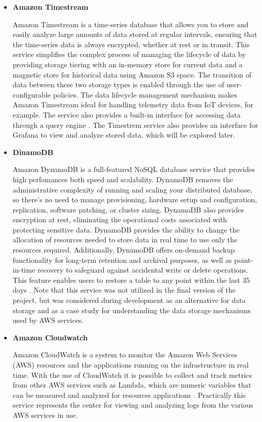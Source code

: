 \begin{itemize}
    \item \textbf{Amazon Timestream}
    
    Amazon Timestream is a time-series database that allows you to store and easily analyze large amounts of data stored at regular intervals, ensuring that the time-series data is always encrypted, whether at rest or in transit. This service simplifies the complex process of managing the lifecycle of data by providing storage tiering with an in-memory store for current data and a magnetic store for historical data using Amazon S3 space. The transition of data between these two storage types is enabled through the use of user-configurable policies. The data lifecycle management mechanism makes Amazon Timestream ideal for handling telemetry data from IoT devices, for example. The service also provides a built-in interface for accessing data through a query engine \cite{AWSTimestream}. The Timestrem service also provides an interface for Grafana to view and analyze stored data, which will be explored later.
    
    \item \textbf{DinamoDB}
    
    Amazon DynamoDB is a full-featured NoSQL database service that provides high perfomances both speed and scalability. DynamoDB removes the administrative complexity of running and scaling your distributed database, so there's no need to manage provisioning, hardware setup and configuration, replication, software patching, or cluster sizing. DynamoDB also provides encryption at rest, eliminating the operational costs associated with protecting sensitive data. DynamoDB provides the ability to change the allocation of resources needed to store data in real time to use only the resources required. Additionally, DynamoDB offers on-demand backup functionality for long-term retention and archival purposes, as well as point-in-time recovery to safeguard against accidental write or delete operations. This feature enables users to restore a table to any point within the last 35 days \cite{AWSDynamoDB}. Note that this service was not utilized in the final version of the project, but was considered during development as an alternative for data storage and as a case study for understanding the data storage mechanisms used by AWS services.
    
    \item \textbf{Amazon Cloudwatch}
    
    Amazon CloudWatch is a system to monitor the Amazon Web Services (AWS) resources and the applications running on the infrastructure in real time. With the use of CloudWatch it is possible to collect and track metrics from other AWS services such as Lambda, which are numeric variables that can be measured and analyzed for resources applications \cite{AWSCloudwatch}. Practically this service represents the center for viewing and analyzing logs from the various AWS services in use.
\end{itemize}

